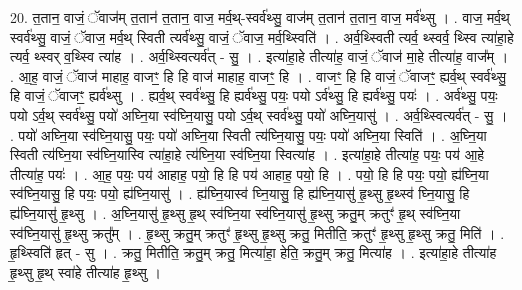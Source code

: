 \documentclass[17pt]{extarticle}
\begin{document}
20. त॒तान॒ वाजं॒ ॅवाज॑म् त॒तान॑ त॒तान॒ वाज॒ मर्व॒थ्-स्वर्व॑थ्सु॒ वाज॑म् त॒तान॑ त॒तान॒ वाज॒ मर्व॑थ्सु । . वाज॒ मर्व॒थ् स्वर्व॑थ्सु॒ वाजं॒ ॅवाज॒ मर्व॒थ् स्विती त्यर्व॑थ्सु॒ वाजं॒ ॅवाज॒ मर्व॒थ्स्विति॑ । . अर्व॒थ्स्विती त्यर्व॒ थ्स्वर्व॒ थ्स्वि त्या॑हा॒हे त्यर्व॒ थ्स्वर् व॒थ्स्वि त्या॑ह । . अर्व॒थ्स्वित्यर्व॑त् - सु॒ । . इत्या॑हा॒हे तीत्या॑ह॒ वाजं॒ ॅवाज॑ मा॒हे तीत्या॑ह॒ वाज᳚म् । . आ॒ह॒ वाजं॒ ॅवाज॑ माहाह॒ वाजꣳ॒॒ हि हि वाज॑ माहाह॒ वाजꣳ॒॒ हि । . वाजꣳ॒॒ हि हि वाजं॒ ॅवाजꣳ॒॒ ह्यर्व॒थ् स्वर्व॑थ्सु॒ हि वाजं॒ ॅवाजꣳ॒॒ ह्यर्व॑थ्सु । . ह्यर्व॒थ् स्वर्व॑थ्सु॒ हि ह्यर्व॑थ्सु॒ पयः॒ पयो ऽर्व॑थ्सु॒ हि ह्यर्व॑थ्सु॒ पयः॑ । . अर्व॑थ्सु॒ पयः॒ पयो ऽर्व॒थ् स्वर्व॑थ्सु॒ पयो॑ अघ्नि॒या स्व॑घ्नि॒यासु॒ पयो ऽर्व॒थ् स्वर्व॑थ्सु॒ पयो॑ अघ्नि॒यासु॑ । . अर्व॒थ्स्वित्यर्व॑त् - सु॒ । . पयो॑ अघ्नि॒या स्व॑घ्नि॒यासु॒ पयः॒ पयो॑ अघ्नि॒या स्विती त्य॑घ्नि॒यासु॒ पयः॒ पयो॑ अघ्नि॒या स्विति॑ । . अ॒घ्नि॒या स्विती त्य॑घ्नि॒या स्व॑घ्नि॒यास्वि त्या॑हा॒हे त्य॑घ्नि॒या स्व॑घ्नि॒या स्वित्या॑ह । . इत्या॑हा॒हे तीत्या॑ह॒ पयः॒ पय॑ आ॒हे तीत्या॑ह॒ पयः॑ । . आ॒ह॒ पयः॒ पय॑ आहाह॒ पयो॒ हि हि पय॑ आहाह॒ पयो॒ हि । . पयो॒ हि हि पयः॒ पयो॒ ह्य॑घ्नि॒या स्व॑घ्नि॒यासु॒ हि पयः॒ पयो॒ ह्य॑घ्नि॒यासु॑ । . ह्य॑घ्नि॒यास्व॑ घ्नि॒यासु॒ हि ह्य॑घ्नि॒यासु॑ हृ॒थ्सु हृ॒थ्स्व॑ घ्नि॒यासु॒ हि ह्य॑घ्नि॒यासु॑ हृ॒थ्सु । . अ॒घ्नि॒यासु॑ हृ॒थ्सु हृ॒थ् स्व॑घ्नि॒या स्व॑घ्नि॒यासु॑ हृ॒थ्सु क्रतु॒म् क्रतुꣳ॑ हृ॒थ् स्व॑घ्नि॒या स्व॑घ्नि॒यासु॑ हृ॒थ्सु क्रतु᳚म् । . हृ॒थ्सु क्रतु॒म् क्रतुꣳ॑ हृ॒थ्सु हृ॒थ्सु क्रतु॒ मितीति॒ क्रतुꣳ॑ हृ॒थ्सु हृ॒थ्सु क्रतु॒ मिति॑ । . हृ॒थ्स्विति॑ हृत् - सु । . क्रतु॒ मितीति॒ क्रतु॒म् क्रतु॒ मित्या॑हा॒ हेति॒ क्रतु॒म् क्रतु॒ मित्या॑ह । . इत्या॑हा॒हे तीत्या॑ह हृ॒थ्सु हृ॒थ् स्वा॑हे तीत्या॑ह हृ॒थ्सु । \newline
\end{document}
